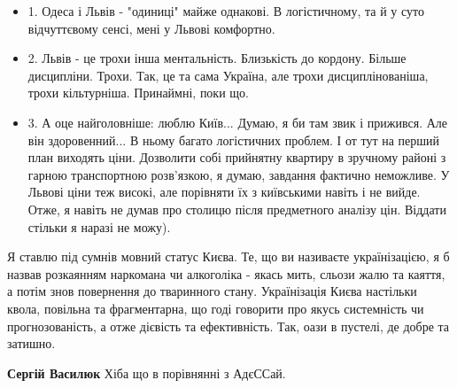 \begin{itemize}
\begin{itemize}
\begin{itemize}
\item 1. Одеса і Львів - "одиниці" майже однакові. В логістичному, та й у суто
відчуттєвому сенсі, мені у Львові комфортно.

\item 2. Львів - це трохи інша ментальність. Близькість до кордону. Більше
дисципліни. Трохи. Так, це та сама Україна, але трохи дисциплінованіша, трохи
кільтурніша. Принаймні, поки що.

\item 3. А оце найголовніше: люблю Київ... Думаю, я би там звик і прижився. Але він
здоровенний... В ньому багато логістичних проблем. І от тут на перший план
виходять ціни. Дозволити собі прийнятну квартиру в зручному районі з гарною
транспортною розв'язкою, я думаю, завдання фактично неможливе. У Львові ціни
теж високі, але порівняти їх з київськими навіть і не вийде. Отже, я навіть не
думав про столицю після предметного аналізу цін. Віддати стільки я наразі не
можу).
\end{itemize}

 

Я ставлю під сумнів мовний статус Києва. Те, що ви називаєте українізацією, я б
назвав розкаянням наркомана чи алкоголіка - якась мить, сльози жалю та каяття,
а потім знов повернення до тваринного стану. Українізація Києва настільки
квола, повільна та фрагментарна, що годі говорити про якусь системність чи
прогнозованість, а отже дієвість та ефективність. Так, оази в пустелі, де добре
та затишно.


 
\textbf{Сергій Василюк} Хіба що в порівнянні з АдєССай.

\end{itemize}

 

\end{itemize}
